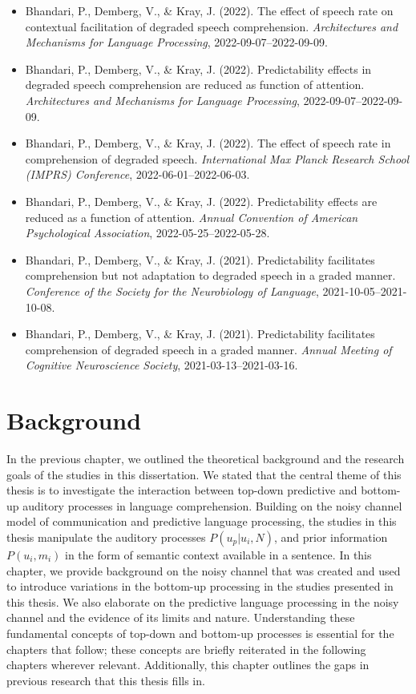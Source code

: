 \documentclass[a4paper, nobind]{templates/ociamthesis}
\providecommand{\tightlist}{%
  \setlength{\itemsep}{0pt}\setlength{\parskip}{0pt}}
\begin{document}
\begin{itemize}
\item
  Bhandari, P., Demberg, V., \& Kray, J.
  (2022).
  The effect of speech rate on contextual facilitation of degraded speech comprehension.
  \emph{Architectures and Mechanisms for Language Processing}, 2022-09-07--2022-09-09.
\item
  Bhandari, P., Demberg, V., \& Kray, J.
  (2022).
  Predictability effects in degraded speech comprehension are reduced as function of attention.
  \emph{Architectures and Mechanisms for Language Processing}, 2022-09-07--2022-09-09.
\item
  Bhandari, P., Demberg, V., \& Kray, J.
  (2022).
  The effect of speech rate in comprehension of degraded speech.
  \emph{International Max Planck Research School (IMPRS) Conference}, 2022-06-01--2022-06-03.
\item
  Bhandari, P., Demberg, V., \& Kray, J.
  (2022).
  Predictability effects are reduced as a function of attention.
  \emph{Annual Convention of American Psychological Association}, 2022-05-25--2022-05-28.
\item
  Bhandari, P., Demberg, V., \& Kray, J.
  (2021).
  Predictability facilitates comprehension but not adaptation to degraded speech in a graded manner.
  \emph{Conference of the Society for the Neurobiology of Language}, 2021-10-05--2021-10-08.
\end{itemize}

\begin{itemize}
\tightlist
\item
  Bhandari, P., Demberg, V., \& Kray, J. (2021). Predictability facilitates comprehension of degraded speech in a graded manner. \emph{Annual Meeting of Cognitive Neuroscience Society}, 2021-03-13--2021-03-16.
\end{itemize}

\hypertarget{chapter-background}{%
\chapter{Background}\label{chapter-background}}

In the previous chapter, we outlined the theoretical background and the research goals of the studies in this dissertation.
We stated that the central theme of this thesis is to investigate the interaction between top-down predictive and bottom-up auditory processes in language comprehension.
Building on the noisy channel model of communication and predictive language processing,
the studies in this thesis manipulate the auditory processes \(P(u_p|u_i,N)\), and prior information \(P(u_i,m_i)\) in the form of semantic context available in a sentence.
In this chapter, we provide background on the noisy channel that was created and used to introduce variations in the bottom-up processing in the studies presented in this thesis.
We also elaborate on the predictive language processing in the noisy channel and the evidence of its limits and nature.
Understanding these fundamental concepts of top-down and bottom-up processes is essential for the chapters that follow;
these concepts are briefly reiterated in the following chapters wherever relevant.
Additionally, this chapter outlines the gaps in previous research that this thesis fills in.
\end{document}
